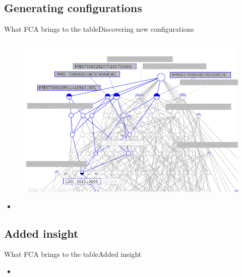 \subsection{Generating configurations}
\begin{frame}{What FCA brings to the table}{Discovering new
    configurations}

\begin{minipage}[t]{0.40\linewidth}
  \begin{figure}[ht]
    \centering
    \includegraphics[width=\textwidth]{img/fca/common_part}
  \end{figure}
\end{minipage}
\begin{minipage}{0.60\linewidth}
  \begin{itemize}
    \item 
  \end{itemize}
\end{minipage}

\end{frame}


\subsection{Added insight}
\begin{frame}{What FCA brings to the table}{Added insight}

\begin{minipage}[t]{0.40\linewidth}
  \begin{figure}[ht]
    \centering
  \end{figure}
\end{minipage}
\begin{minipage}{0.60\linewidth}
  \begin{itemize}
    \item 
  \end{itemize}
\end{minipage}

\end{frame}